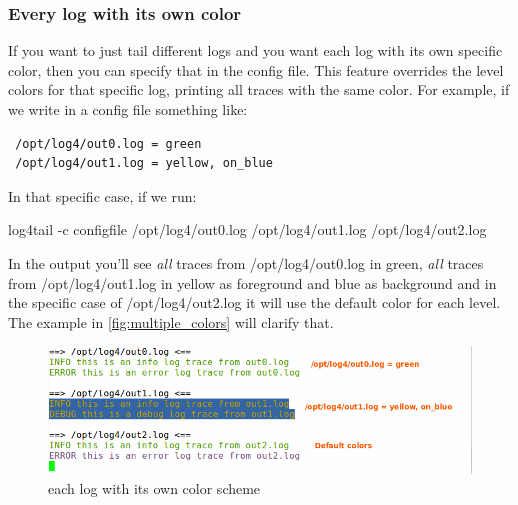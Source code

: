 \subsubsection{Every log with its own color}
If you want to just tail different logs and you want each log with its own specific color, 
then you can specify that in the config file. This feature overrides the level colors for that 
specific log, printing all traces with the same color. 
For example, if we write in a config file something like:
\begin{verbatim}
 /opt/log4/out0.log = green
 /opt/log4/out1.log = yellow, on_blue
\end{verbatim}
In that specific case, if we run:
\begin{cmd}
 log4tail -c configfile /opt/log4/out0.log /opt/log4/out1.log /opt/log4/out2.log
\end{cmd}
In the output you'll see \emph{all} traces from /opt/log4/out0.log in green, 
\emph{all} traces from /opt/log4/out1.log in yellow as foreground and blue as background 
and in the specific case of /opt/log4/out2.log it will use the default color for each level. 
The example in \autoref{fig:multiple_colors} will clarify that.

\begin{figure}[hb]
\centering
\includegraphics[scale=0.60]{multiple_colors.png}
\caption{\logftailer{} each log with its own color scheme}\label{fig:multiple_colors}
\end{figure}



